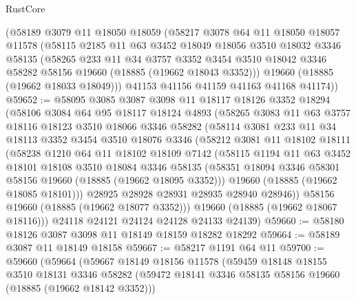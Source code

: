 \begin{lexlean}{RustCore}
\begin{coremodule}
    (@58189
      @3079
      @11
      @18050
      @18059
      (@58217
        @3078
        @64
        @11
        @18050
        @18057
        @11578
        (@58115
          @2185
          @11
          @63
          @3452
          @18049
          @18056
          @3510
          @18032
          @3346
          @58135
          (@58265
            @233
            @11
            @34
            @3757
            @3352
            @3454
            @3510
            @18042
            @3346
            @58282
            @58156
            @19660
            (@18885 (@19662 @18043 @3352)))
          @19660
          (@18885 (@19662 @18033 @18049)))
        @41153
        @41156
        @41159
        @41163
        @41168
        @41174))
@59652 := @58095
    @3085
    @3087
    @3098
    @11
    @18117
    @18126
    @3352
    @18294
    (@58106
      @3084
      @64
      @95
      @18117
      @18124
      @4893
      (@58265
        @3083
        @11
        @63
        @3757
        @18116
        @18123
        @3510
        @18066
        @3346
        @58282
        (@58114
          @3081
          @233
          @11
          @34
          @18113
          @3352
          @3454
          @3510
          @18076
          @3346
          (@58212
            @3081
            @11
            @18102
            @18111
            (@58238
              @1210
              @64
              @11
              @18102
              @18109
              @7142
              (@58115
                @1194
                @11
                @63
                @3452
                @18101
                @18108
                @3510
                @18084
                @3346
                @58135
                (@58351 @18094 @3346 @58301 @58156 @19660 (@18885 (@19662 @18095 @3352)))
                @19660
                (@18885 (@19662 @18085 @18101)))
              @28925
              @28928
              @28931
              @28935
              @28940
              @28946))
          @58156
          @19660
          (@18885 (@19662 @18077 @3352)))
        @19660
        (@18885 (@19662 @18067 @18116)))
      @24118
      @24121
      @24124
      @24128
      @24133
      @24139)
@59660 := @58180 @18126 @3087 @3098 @11 @18149 @18159 @18282 @18292
@59664 := @58189 @3087 @11 @18149 @18158
@59667 := @58217 @1191 @64 @11
@59700 := @59660
    (@59664
      (@59667
        @18149
        @18156
        @11578
        (@59459
          @18148
          @18155
          @3510
          @18131
          @3346
          @58282
          (@59472 @18141 @3346 @58135 @58156 @19660 (@18885 (@19662 @18142 @3352)))

\end{coremodule}
\end{lexlean}
